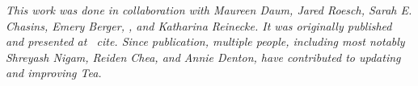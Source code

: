 \textit{This work was done in collaboration with Maureen Daum, Jared Roesch, Sarah E.
Chasins, Emery Berger, \reneJust, and Katharina Reinecke. It was originally
published and presented at ~cite{}. Since publication, multiple
people, including most notably Shreyash Nigam, Reiden Chea, and Annie Denton,
have contributed to updating and improving Tea.}
